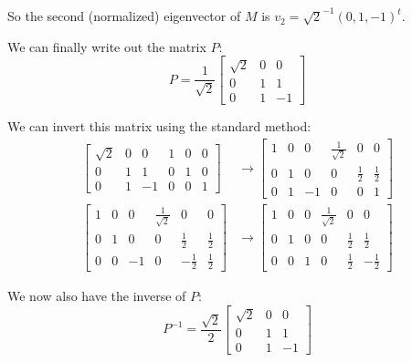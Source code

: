 \documentclass{article}
\begin{document}
So the second (normalized) eigenvector of $M$ is $v_2 = \sqrt{2}^{-1}(0,1,-1)^t$.

We can finally write out the matrix $P$:
\begin{equation}
    P = \frac{1}{\sqrt{2}}\begin{bmatrix} \sqrt{2} & 0 & 0 \\ 0 & 1 & 1 \\ 0 & 1 & -1 \end{bmatrix}
\end{equation}  

We can invert this matrix using the standard method:
\begin{align*}
    \left[ \begin{array}{ccc|ccc} \sqrt{2} & 0 & 0 & 1 & 0 & 0  \\ 0 & 1 & 1 & 0 & 1 & 0 \\ 0 & 1 & -1 & 0 & 0 & 1 \end{array} \right]
    &\rightarrow \left[ \begin{array}{ccc|ccc} 1 & 0 & 0 & \frac{1}{\sqrt{2}} & 0 & 0  \\ 0 & 1 & 0 & 0 & \frac{1}{2} & \frac{1}{2} \\ 0 & 1 & -1 & 0 & 0 & 1 \end{array} \right] \\ 
    \left[ \begin{array}{ccc|ccc} 1 & 0 & 0 & \frac{1}{\sqrt{2}} & 0 & 0  \\ 0 & 1 & 0 & 0 & \frac{1}{2} & \frac{1}{2} \\ 0 & 0 & -1 & 0 & -\frac{1}{2} & \frac{1}{2} \end{array} \right]
    &\rightarrow \left[ \begin{array}{ccc|ccc} 1 & 0 & 0 & \frac{1}{\sqrt{2}} & 0 & 0  \\ 0 & 1 & 0 & 0 & \frac{1}{2} & \frac{1}{2} \\ 0 & 0 & 1 & 0 & \frac{1}{2} & -\frac{1}{2} \end{array} \right]
\end{align*}

We now also have the inverse of $P$:
\begin{equation}
    P^{-1} = \frac{\sqrt{2}}{2}\begin{bmatrix} \sqrt{2} & 0 & 0 \\ 0 & 1 & 1 \\ 0 & 1 & -1 \end{bmatrix}
\end{equation}
\end{document}
